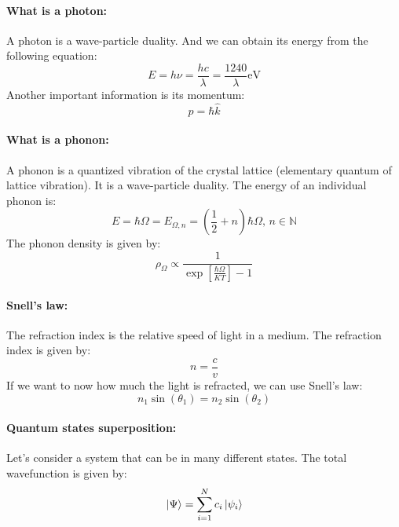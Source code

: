 \paragraph{What is a photon:} A photon is a wave-particle duality. And we can obtain its energy from the following equation:
\begin{equation}
    E = h \nu = \frac{hc}{\lambda} = \frac{1240}{\lambda} \text{eV}
\end{equation}
Another important information is its momentum:
\begin{equation}
    p = \hbar \hat{k}
\end{equation}

\paragraph{What is a phonon:} A phonon is a quantized vibration of the crystal lattice (elementary quantum of lattice vibration). It is a wave-particle duality. The energy of an individual phonon is:
\begin{equation}
    E = \hbar \Omega = E_{\Omega, n} = \left(\frac{1}{2} + n\right)\hbar \Omega\text{, }n \in \mathbb{N}
\end{equation}
The phonon density is given by:
\begin{equation}
    \rho_{\Omega} \propto \frac{1}{\exp\left[\frac{\hbar\Omega}{KT}\right] - 1}
\end{equation}

\paragraph{Snell's law:} The refraction index is the relative speed of light in a medium. The refraction index is given by:
\begin{equation}
    n = \frac{c}{v}
\end{equation}
If we want to now how much the light is refracted, we can use Snell's law:
\begin{equation}
    n_1 \sin(\theta_1) = n_2 \sin(\theta_2)
\end{equation}

\paragraph{Quantum states superposition:} Let's consider a system that can be in many different states. The total wavefunction is given by:
\begin{equation}
    \ket{\Psi} = \sum_{i=1}^{N} c_i \ket{\psi_i}
\end{equation}

